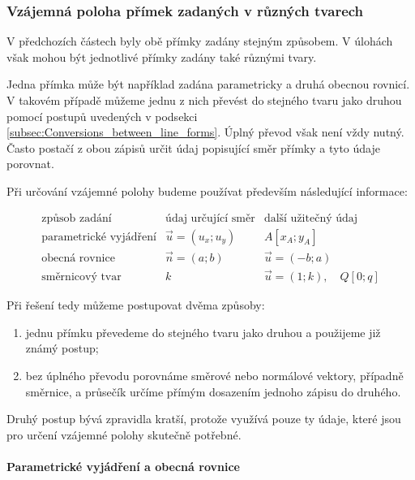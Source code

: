 \subsubsection{Vzájemná poloha přímek zadaných v různých tvarech}
\label{subsubsec:Relative_position_mixed_line_forms}

V předchozích částech byly obě přímky zadány stejným způsobem.
V úlohách však mohou být jednotlivé přímky zadány také různými tvary.

Jedna přímka může být například zadána parametricky a druhá obecnou
rovnicí. V takovém případě můžeme jednu z nich převést do stejného
tvaru jako druhou pomocí postupů uvedených v podsekci
\ref{subsec:Conversions_between_line_forms}. Úplný převod však není
vždy nutný. Často postačí z obou zápisů určit údaj popisující směr
přímky a tyto údaje porovnat.

Při určování vzájemné polohy budeme používat především následující
informace:

\begingroup
\renewcommand{\arraystretch}{1.6}
\[
\begin{array}{c|c|c}
    \text{způsob zadání}
    &
    \text{údaj určující směr}
    &
    \text{další užitečný údaj}
    \\
    \hline
    \text{parametrické vyjádření}
    &
    \vec{u}=(u_x;u_y)
    &
    A[x_A;y_A]
    \\[1mm]
    \text{obecná rovnice}
    &
    \vec{n}=(a;b)
    &
    \vec{u}=(-b;a)
    \\[1mm]
    \text{směrnicový tvar}
    &
    k
    &
    \vec{u}=(1;k),\quad Q[0;q]
\end{array}
\]
\endgroup

Při řešení tedy můžeme postupovat dvěma způsoby:

\begin{enumerate}
    \item jednu přímku převedeme do stejného tvaru jako druhou
    a použijeme již známý postup;
    \item bez úplného převodu porovnáme směrové nebo normálové vektory,
    případně směrnice, a průsečík určíme přímým dosazením jednoho
    zápisu do druhého.
\end{enumerate}

Druhý postup bývá zpravidla kratší, protože využívá pouze ty údaje,
které jsou pro určení vzájemné polohy skutečně potřebné.


\paragraph{Parametrické vyjádření a obecná rovnice}


